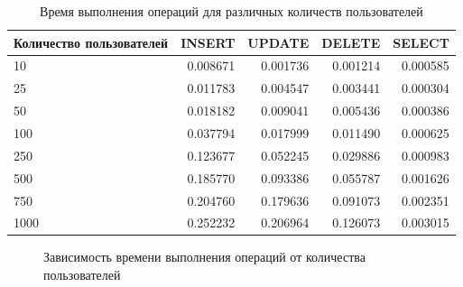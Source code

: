 \newpage
\begin{table}[ht!]
	\begin{center}
		\caption{Время выполнения операций для различных количеств пользователей}
		\begin{tabular}{ ||p{3.5cm}|r|r|r|r||  }
			\hline
			Количество пользователей & INSERT & UPDATE & DELETE & SELECT \\[1.5ex]
			\hline\hline
			10  & 0.008671  & 0.001736 & 0.001214  & 0.000585  \\
			25  & 0.011783 & 0.004547  & 0.003441  & 0.000304  \\
			50  & 0.018182  & 0.009041  & 0.005436  & 0.000386  \\
			100 & 0.037794 & 0.017999  & 0.011490  & 0.000625  \\
			250 & 0.123677 & 0.052245  & 0.029886  & 0.000983  \\
			500 & 0.185770  & 0.093386  & 0.055787 & 0.001626  \\
			750 & 0.204760 & 0.179636  & 0.091073  & 0.002351 \\
			1000 & 0.252232  & 0.206964 & 0.126073 & 0.003015  \\
			\hline
		\end{tabular}
		\label{operation-times}
	\end{center}
\end{table}

\begin{figure}[ht!]
	\begin{center}
	\end{center}
	\caption{Зависимость времени выполнения операций от количества пользователей}
	\label{grp:dr}
\end{figure}

